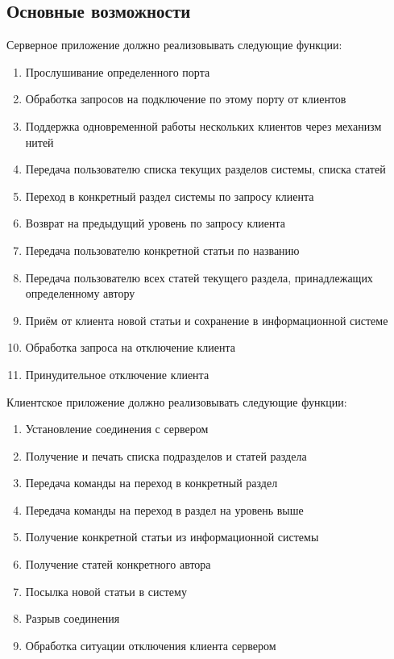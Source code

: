 \documentclass[12pt,a4paper]{report}
\begin{document}
\subsection{Основные возможности}
Серверное приложение должно реализовывать следующие функции:
\begin{enumerate}
\item Прослушивание определенного порта
\item Обработка запросов на подключение по этому порту от клиентов
\item Поддержка одновременной работы нескольких клиентов через механизм нитей

\item Передача пользователю списка текущих разделов системы, списка статей
\item Переход в конкретный раздел системы по запросу клиента
\item Возврат на предыдущий уровень по запросу клиента
\item Передача пользователю конкретной статьи по названию
\item Передача пользователю всех статей текущего раздела, принадлежащих определенному автору
\item Приём от клиента новой статьи и сохранение в информационной системе
\item Обработка запроса на отключение клиента
\item Принудительное отключение клиента
\end{enumerate}
Клиентское приложение должно реализовывать следующие функции:
\begin{enumerate}
\item Установление соединения с сервером
\item Получение и печать списка подразделов и статей раздела
\item Передача команды на переход в конкретный раздел
\item Передача команды на переход в раздел на уровень выше
\item Получение конкретной статьи из информационной системы
\item Получение статей конкретного автора
\item Посылка новой статьи в систему
\item Разрыв соединения
\item Обработка ситуации отключения клиента сервером 
\end{enumerate}
\end{document}
